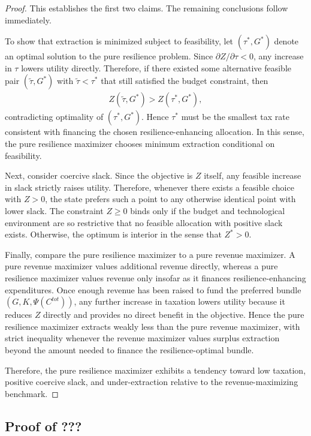 \documentclass[12pt]{article}
\begin{document}
\begin{proof}
This establishes the first two claims. The remaining conclusions follow immediately.

To show that extraction is minimized subject to feasibility, let $(\tau^*,G^*)$ denote an optimal solution to the pure resilience problem. Since $\partial Z/\partial \tau<0$, any increase in $\tau$ lowers utility directly. Therefore, if there existed some alternative feasible pair $(\tilde\tau,G^*)$ with $\tilde\tau<\tau^*$ that still satisfied the budget constraint, then
\begin{align}
Z(\tilde\tau,G^*) > Z(\tau^*,G^*),
\end{align}
contradicting optimality of $(\tau^*,G^*)$. Hence $\tau^*$ must be the smallest tax rate consistent with financing the chosen resilience-enhancing allocation. In this sense, the pure resilience maximizer chooses minimum extraction conditional on feasibility.

Next, consider coercive slack. Since the objective is $Z$ itself, any feasible increase in slack strictly raises utility. Therefore, whenever there exists a feasible choice with $Z>0$, the state prefers such a point to any otherwise identical point with lower slack. The constraint $Z\ge 0$ binds only if the budget and technological environment are so restrictive that no feasible allocation with positive slack exists. Otherwise, the optimum is interior in the sense that $Z^*>0$.

Finally, compare the pure resilience maximizer to a pure revenue maximizer. A pure revenue maximizer values additional revenue directly, whereas a pure resilience maximizer values revenue only insofar as it finances resilience-enhancing expenditures. Once enough revenue has been raised to fund the preferred bundle $(G,K,\Psi(C^{tot}))$, any further increase in taxation lowers utility because it reduces $Z$ directly and provides no direct benefit in the objective. Hence the pure resilience maximizer extracts weakly less than the pure revenue maximizer, with strict inequality whenever the revenue maximizer values surplus extraction beyond the amount needed to finance the resilience-optimal bundle.

Therefore, the pure resilience maximizer exhibits a tendency toward low taxation, positive coercive slack, and under-extraction relative to the revenue-maximizing benchmark.
\end{proof}

\subsection{Proof of ???}
\end{document}
